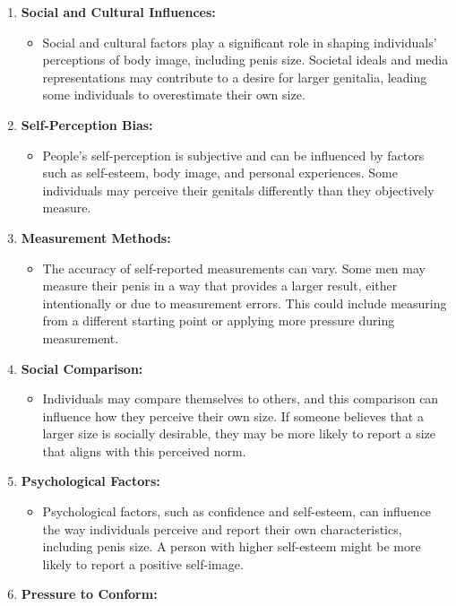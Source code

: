 \documentclass[
  10pt,
  letterpaper,
]{article}
\providecommand{\tightlist}{%
  \setlength{\itemsep}{0pt}\setlength{\parskip}{0pt}}\usepackage{longtable,booktabs,array}
\begin{document}
\begin{enumerate}
\def\labelenumi{\arabic{enumi}.}
\tightlist
\item
  \textbf{Social and Cultural Influences:}

  \begin{itemize}
  \tightlist
  \item
    Social and cultural factors play a significant role in shaping
    individuals' perceptions of body image, including penis size.
    Societal ideals and media representations may contribute to a desire
    for larger genitalia, leading some individuals to overestimate their
    own size.
  \end{itemize}
\item
  \textbf{Self-Perception Bias:}

  \begin{itemize}
  \tightlist
  \item
    People's self-perception is subjective and can be influenced by
    factors such as self-esteem, body image, and personal experiences.
    Some individuals may perceive their genitals differently than they
    objectively measure.
  \end{itemize}
\item
  \textbf{Measurement Methods:}

  \begin{itemize}
  \tightlist
  \item
    The accuracy of self-reported measurements can vary. Some men may
    measure their penis in a way that provides a larger result, either
    intentionally or due to measurement errors. This could include
    measuring from a different starting point or applying more pressure
    during measurement.
  \end{itemize}
\item
  \textbf{Social Comparison:}

  \begin{itemize}
  \tightlist
  \item
    Individuals may compare themselves to others, and this comparison
    can influence how they perceive their own size. If someone believes
    that a larger size is socially desirable, they may be more likely to
    report a size that aligns with this perceived norm.
  \end{itemize}
\item
  \textbf{Psychological Factors:}

  \begin{itemize}
  \tightlist
  \item
    Psychological factors, such as confidence and self-esteem, can
    influence the way individuals perceive and report their own
    characteristics, including penis size. A person with higher
    self-esteem might be more likely to report a positive self-image.
  \end{itemize}
\item
  \textbf{Pressure to Conform:}


\end{enumerate}
\end{document}
